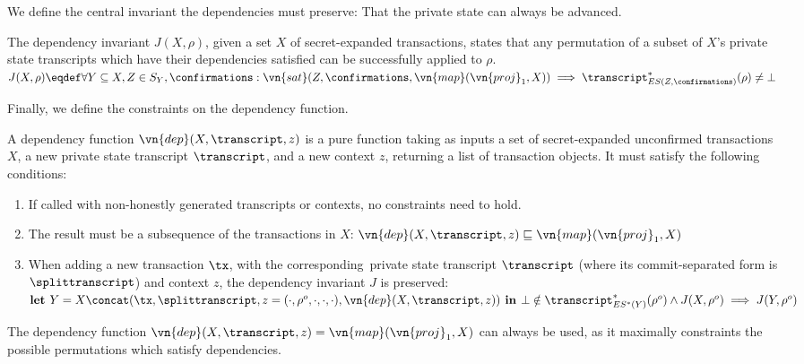 \noindent We define the central invariant the dependencies must preserve:
That the private state can always be advanced.

\begin{definition}
  \sloppy
  \label{def:invdep}
  The dependency invariant $J(X, \rho)$, given a set $X$ of secret-expanded
  transactions, states that any permutation of a subset of $X$'s private state
  transcripts which have their dependencies satisfied can be successfully applied to $\rho$.
  $J(X, \rho) \eqdef \forall Y \subseteq X, Z \in S_Y, \confirmations : \vn{sat}(Z,\allowbreak
  \confirmations, \vn{map}(\vn{proj}_1, X)) \implies
  \transcript^*_{ES(Z, \confirmations)}(\rho) \neq \bot$
\end{definition}

\fussy
\noindent Finally, we define the constraints on the dependency function.

\begin{definition}
  \label{def:dep}
  A dependency function $\vn{dep}(X, \transcript, z)$ is a pure function taking
  as inputs a set of secret-expanded unconfirmed transactions $X$, a new
  private state transcript $\transcript$, and a new context $z$, returning a
  list of transaction objects. It must satisfy the following conditions:
  \begin{enumerate}
    \item If called with non-honestly generated transcripts or contexts, no
      constraints need to hold.
    \item The result must be a subsequence of the transactions in $X$:
      $\vn{dep}(X, \transcript, z) \sqsubseteq \vn{map}(\vn{proj}_1, X)$
    \item When adding a new transaction $\tx$, with the corresponding\
      private state transcript $\transcript$ (where its
        commit-separated form is $\splittranscript$) and context $z$, the
      dependency invariant $J$ is preserved: $\textbf{let }\allowbreak Y =
      X\allowbreak \concat (\tx, \splittranscript,\allowbreak
      z\allowbreak =\allowbreak (\cdot, \rho^o, \cdot, \cdot, \cdot),
      \vn{dep}(X,\allowbreak \transcript,\allowbreak z)) \allowbreak\textbf{ in
      }\allowbreak \bot \notin \transcript^*_{ES^*(Y)}(\rho^o) \land {} \allowbreak J(X, \rho^o)\allowbreak \implies
      J(Y,\allowbreak \rho^o)$
  \end{enumerate}
\end{definition}

The dependency function $\vn{dep}(X, \transcript, z) = \vn{map}(\vn{proj}_1, X)$
can always be used, as it maximally constraints the possible permutations which
satisfy dependencies.


